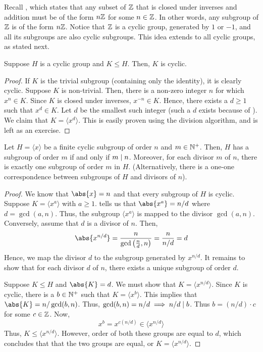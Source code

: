  Recall , which states that any subset of $\mathbb{Z}$ that is closed under inverses and addition must be of the form $n\mathbb{Z}$ for some $n \in \mathbb{Z}$. In other words, any subgroup of $\mathbb{Z}$ is of the form $n\mathbb{Z}$. Notice that $\mathbb{Z}$ is a cyclic group, generated by $1$ or $-1$, and all its subgroups are also cyclic subgroups. This idea extends to all cyclic groups, as stated next.

\begin{prop} \label{prop:cylic-subgroup-cyclic}
    Suppose $H$ is a cyclic group and $K \leq H$. Then, $K$ is cyclic.
\end{prop}
\begin{proof}
    If $K$ is the trivial subgroup (containing only the identity), it is clearly cyclic. Suppose $K$ is non-trivial. Then, there is a non-zero integer $n$ for which $x^n \in K$. Since $K$ is closed under inverses, $x^{-n} \in K$. Hence, there exists a $d \geq 1$ such that $x^d \in K$. Let $d$ be the smallest such integer (such a $d$ exists because of ). We claim that $K = \langle x^d \rangle$. This is easily proven using the division algorithm, and is left as an exercise.
\end{proof}

\begin{theorem} \label{thm:cyclic-subgroup-divisor}
    Let $H = \langle x \rangle$ be a finite cyclic subgroup of order $n$ and $m \in \mathbb{N}^+$. Then, $H$ has a subgroup of order $m$ if and only if $m \mid n$. Moreover, for each divisor $m$ of $n$, there is exactly one subgroup of order $m$ in $H$. (Alternatively, there is a one-one correspondence between subgroups of $H$ and divisors of $n$).
\end{theorem}
\begin{proof}
    We know that $\abs{x} = n$ and that every subgroup of $H$ is cyclic. Suppose $K = \langle x^a \rangle$ with $a \geq 1$.  tells us that $\abs{x^a} = n/d$ where $d = \gcd(a,n)$. Thus, the subgroup $\langle x^a \rangle$ is mapped to the divisor $\gcd(a,n)$. Conversely, assume that $d$ is a divisor of $n$. Then, 
    \[
        \abs{x^{n/d}} = \frac{n}{\gcd\left( \frac{n}{d}, n \right)} = \frac{n}{n/d} = d
    \]
    Hence, we map the divisor $d$ to the subgroup generated by $x^{n/d}$. It remains to show that for each divisor $d$ of $n$, there exists a unique subgroup of order $d$. 

    Suppose $K \leq H$ and $\abs{K} = d$. We must show that $K = \langle x^{n/d} \rangle$. Since $K$ is cyclic, there is a $b \in \mathbb{N}^+$ such that $K = \langle x^b \rangle$. This implies that $\abs{K} = n/\gcd(b,n)$. Thus, $\gcd(b,n) = n/d \implies n/d \mid b$. Thus $b = (n/d) \cdot c$ for some $c \in \mathbb{Z}$. Now,
    \[
        x^b = x^{c(n/d)} \in \langle x^{n/d} \rangle
    \]
    Thus, $K \leq \langle x^{n/d} \rangle$. However, order of both these groups are equal to $d$, which concludes that that the two groups are equal, or $K = \langle x^{n/d} \rangle$.
\end{proof}

